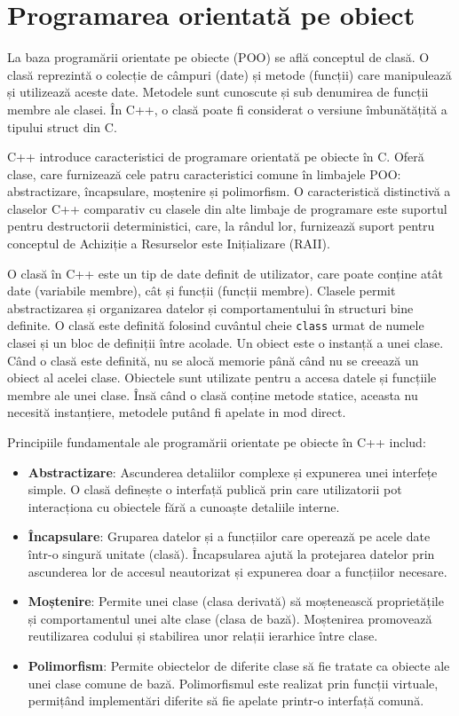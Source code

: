 \documentclass[a4paper,12pt]{report}
\begin{document}
\section{Programarea orientată pe obiect}
La baza programării orientate pe obiecte (POO) se află conceptul de clasă. O clasă reprezintă o colecție de câmpuri (date) și metode (funcții) care manipulează și utilizează aceste date. Metodele sunt cunoscute și sub denumirea de funcții membre ale clasei. În C++, o clasă poate fi considerat o versiune îmbunătățită a tipului struct din C.

C++ introduce caracteristici de programare orientată pe obiecte în C. Oferă clase, care furnizează cele patru caracteristici comune în limbajele POO: abstractizare, încapsulare, moștenire și polimorfism. O caracteristică distinctivă a claselor C++ comparativ cu clasele din alte limbaje de programare este suportul pentru destructorii deterministici, care, la rândul lor, furnizează suport pentru conceptul de Achiziție a Resurselor este Inițializare (RAII).

O clasă în C++ este un tip de date definit de utilizator, care poate conține atât date (variabile membre), cât și funcții (funcții membre). Clasele permit abstractizarea și organizarea datelor și comportamentului în structuri bine definite. O clasă este definită folosind cuvântul cheie \texttt{class} urmat de numele clasei și un bloc de definiții între acolade. Un obiect este o instanță a unei clase. Când o clasă este definită, nu se alocă memorie până când nu se creează un obiect al acelei clase. Obiectele sunt utilizate pentru a accesa datele și funcțiile membre ale unei clase. Însă când o clasă conține metode statice, aceasta nu necesită instanțiere, metodele putând fi apelate in mod direct.

Principiile fundamentale ale programării orientate pe obiecte în C++ includ:
\begin{itemize}
    \item \textbf{Abstractizare}: Ascunderea detaliilor complexe și expunerea unei interfețe simple. O clasă definește o interfață publică prin care utilizatorii pot interacționa cu obiectele fără a cunoaște detaliile interne.
    \item \textbf{Încapsulare}: Gruparea datelor și a funcțiilor care operează pe acele date într-o singură unitate (clasă). Încapsularea ajută la protejarea datelor prin ascunderea lor de accesul neautorizat și expunerea doar a funcțiilor necesare.
    \item \textbf{Moștenire}: Permite unei clase (clasa derivată) să moștenească proprietățile și comportamentul unei alte clase (clasa de bază). Moștenirea promovează reutilizarea codului și stabilirea unor relații ierarhice între clase.
    \item \textbf{Polimorfism}: Permite obiectelor de diferite clase să fie tratate ca obiecte ale unei clase comune de bază. Polimorfismul este realizat prin funcții virtuale, permițând implementări diferite să fie apelate printr-o interfață comună.
\end{itemize}
\end{document}
